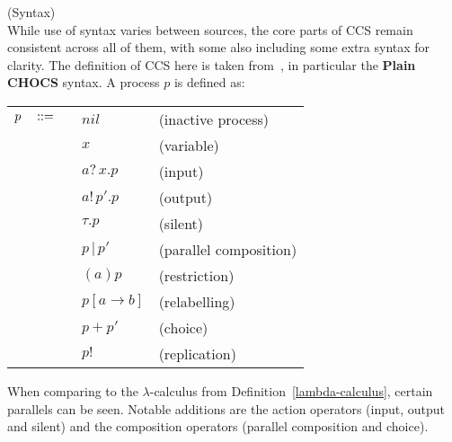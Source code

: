 \documentclass{article}
\begin{document}
        \begin{definition}{(Syntax)\\}
            While use of syntax varies between sources, the core parts of CCS remain consistent across all of them, with some also including some extra syntax for clarity.
            The definition of CCS here is taken from~\cite{pi-calculus-in-ccs}, in particular the \textbf{Plain CHOCS} syntax. A process $p$ is defined as:
            \begin{center}
                \begin{tabular}{ l l l }
                    $p \quad ::= \quad$  & $nil$                 & (inactive process) \\
                                            & $x$                   & (variable) \\
                                            & $a? \, x.p$           & (input) \\
                                            & $a! \, p'.p$          & (output) \\
                                            & $\tau.p$              & (silent) \\
                                            & $p \, | \, p'$        & (parallel composition) \\
                                            & $(a)p$                & (restriction) \\
                                            & $p[a \rightarrow b]$  & (relabelling)~\footnotemark\\
                                            & $p + p'$              & (choice)~\footnotemark\\
                                            & $p!$                  & (replication)
                \end{tabular}
            \end{center}
            \addtocounter{footnote}{-1} 
        \end{definition}
        When comparing to the $\lambda$-calculus from Definition~\ref{lambda-calculus}, certain parallels can be seen.
        Notable additions are the action operators (input, output and silent) and the composition operators (parallel composition and choice). \\
\end{document}
